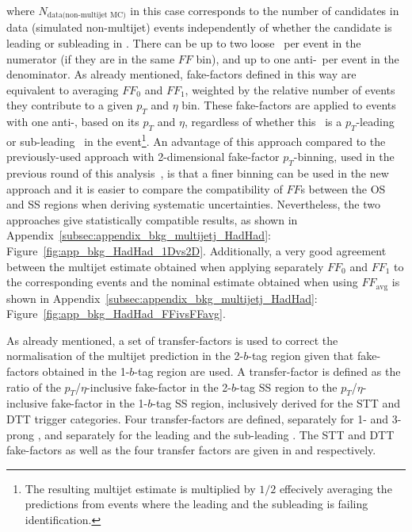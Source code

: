 where $N_{\text{data(non-multijet MC)}}$ in this case corresponds to the number
of \tauhad candidates in data (simulated non-multijet) events independently of
whether the \tauhadvis candidate is leading or subleading in \pT. There can be
up to two loose \tauhad\ per event in the numerator (if they are in the same
$FF$ bin), and up to one anti-\tauhad\ per event in the denominator. As already
mentioned, fake-factors defined in this way are equivalent to averaging $FF_0$
and $FF_1$, weighted by the relative number of events they contribute to a given
$p_T$ and $\eta$ bin. These fake-factors are applied to events with one anti-\tauhad, based
on its $p_T$ and $\eta$, regardless of whether this \tauhad\ is a $p_T$-leading or
sub-leading \tauhad\ in the event\footnote{The resulting multijet estimate is
  multiplied by $1/2$ effecively averaging the predictions from events where the
  leading \tauhad and the subleading \tauhad is failing identification.}. An
advantage of this approach compared to the previously-used approach with
2-dimensional fake-factor $p_T$-binning, used in the previous round of this analysis~\cite{HIGG-2016-16}, is that a finer binning can be used in
the new approach and it is easier to compare the compatibility of $FF$s between
the OS and SS regions when deriving systematic uncertainties. Nevertheless, the
two approaches give statistically compatible results, as shown in Appendix~\ref{subsec:appendix_bkg_multijetj_HadHad}: Figure~\ref{fig:app_bkg_HadHad_1Dvs2D}. Additionally, a very good agreement between the multijet estimate 
obtained when applying separately $FF_0$ and $FF_1$ to the corresponding 
events and the nominal estimate obtained when using $FF_{\mathrm{avg}}$ is 
shown in Appendix~\ref{subsec:appendix_bkg_multijetj_HadHad}: Figure~\ref{fig:app_bkg_HadHad_FFivsFFavg}.

As already mentioned, a set of transfer-factors is used to correct the
normalisation of the multijet prediction in the 2-$b$-tag region given that
fake-factors obtained in the 1-$b$-tag region are used. A transfer-factor is
defined as the ratio of the $p_T$/$\eta$-inclusive fake-factor in the 2-$b$-tag SS
region to the $p_T$/$\eta$-inclusive fake-factor in the 1-$b$-tag SS region,
inclusively derived for the STT and DTT trigger categories. Four
transfer-factors are defined, separately for 1- and 3-prong \tauhad, and
separately for the leading and the sub-leading \tauhad. The STT and DTT
fake-factors as well as the four transfer factors are given in
 and  respectively.

